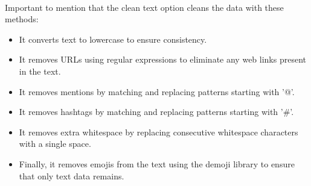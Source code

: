 \noindent \\
Important to mention that the clean text option cleans the data with these methods:
\begin{itemize}
    \item It converts text to lowercase to ensure consistency.
    \item It removes URLs using regular expressions to eliminate any web links present in the text.
    \item It removes mentions by matching and replacing patterns starting with '@'.
    \item It removes hashtags by matching and replacing patterns starting with '\#'.
    \item It removes extra whitespace by replacing consecutive whitespace characters with a single space.
    \item Finally, it removes emojis from the text using the demoji library to ensure that only text data remains.
\end{itemize}

